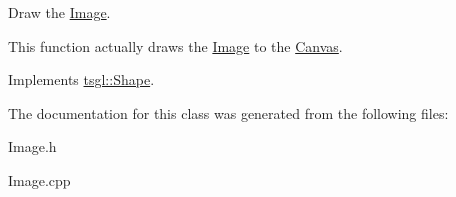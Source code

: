 Draw the \hyperlink{classtsgl_1_1_image}{Image}. 

This function actually draws the \hyperlink{classtsgl_1_1_image}{Image} to the \hyperlink{classtsgl_1_1_canvas}{Canvas}. 

Implements \hyperlink{classtsgl_1_1_shape_af78b1627b97d621824ce86db214e2402}{tsgl\+::\+Shape}.



The documentation for this class was generated from the following files\+:\begin{DoxyCompactItemize}
\item 
Image.\+h\item 
Image.\+cpp\end{DoxyCompactItemize}
